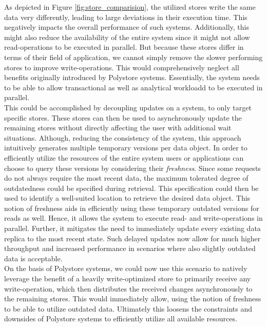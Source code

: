 As depicted in Figure \ref{fig:store_comparision}, the utilized stores write the same data very differently, leading to large deviations in their execution time. 
This negatively impacts the overall performance of such systems.
Additionally, this might also reduce the availability of the entire system since it might not allow read-operations to be executed in parallel. 
But because these stores differ in terms of their field of application, we cannot simply remove the slower performing stores to improve write-operations. 
This would comprehensively neglect all benefits originally introduced by Polystore systems.
Essentially, the system needs to be able to allow transactional as well as analytical workloadd to be executed in parallel.\\
This could be accomplished by decoupling updates on a system, to only target specific stores. 
These stores can then be used to asynchronously update
the remaining stores without directly affecting the user with additional wait situations.
Although, reducing the consistency of the system, this approach intuitively generates multiple temporary versions per data object.
In order to efficiently utilize the resources of the entire system users or applications can choose to query these versions by
considering their \emph{freshness}.
Since some requests do not always require the most recent data, the maximum tolerated degree of outdatedness could be specified during retrieval.
This specification could then be used to identify a well-suited location to retrieve the desired data object. 
This notion of freshness aids in efficiently using these temporary outdated versions for reads as well. 
Hence, it allows the system to execute read- and write-operations in parallel.
Further, it mitigates the need to immediately update every existing data replica to the most recent state.
Such delayed updates now allow for much higher throughput and increased performance in scenarios where also slightly 
outdated data is acceptable.\\
On the basis of Polystore systems, we could now use this scenario to natively leverage the benefit of a heavily write-optimized store to 
primarily receive any write-operation, which then distributes the received changes asynchronously to the remaining stores. This
would immediately allow, using the notion of freshness to be able to utilize outdated data.
Ultimately this loosens the constraints and downsides of Polystore systems to efficiently utilize all available resources.




